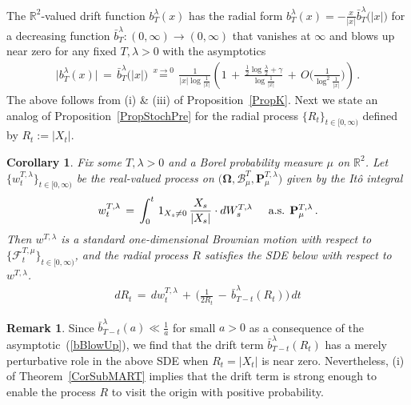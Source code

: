 \documentclass[10pt]{article}
\def\stackrel#1#2{\mathrel{\mathop{#2}\limits^{#1}}}
\numberwithin{equation}{section}
\newtheorem{corollary}[theorem]{Corollary}
\theoremstyle{definition}
\newtheorem{remark}[theorem]{Remark}
\newcommand{\R}{{\mathbb R}}
\begin{document}
   The   $\R^2$-valued drift function $b_{T}^{\lambda}(x)$ has the radial form $b_{T}^{\lambda}(x)=-\frac{x}{|x| }\bar{b}_{T}^{\lambda}\big(|x|\big)$ for a decreasing function  $\bar{b}_{T}^{\lambda}:(0,\infty)\rightarrow (0,\infty)$ that vanishes at $\infty$ and blows up near zero for any fixed $T,\lambda>0$ with the asymptotics 
  \begin{align}\label{bBlowUp}
  \big| b_{T}^{\lambda}(x)\big| \,= \,\bar{b}_{T}^{\lambda}\big(|x|\big)\, \stackrel{x\rightarrow 0 }{=}  \,\frac{ 1 }{|x|\log \frac{1}{|x|} }\left(1 \,+\,\frac{\frac{1}{2}\log\frac{\lambda}{2} +\gamma   }{\log\frac{1}{|x|}   } \,+\,\mathit{O}\bigg(  \frac{1  }{\log^2\frac{1}{|x|}   }   \bigg)    \right)    \,.
  \end{align}
The above follows from (i) \& (iii) of Proposition~\ref{PropK}.  Next we state an analog of Proposition~\ref{PropStochPre} for the radial process $\{ R_t\}_{t\in [0,\infty)}$ defined by $R_t:=|X_t|$.
\begin{corollary}\label{CorollaryToPropStoch}  Fix some $T,\lambda >0$ and a Borel probability measure $\mu$ on $\R^2$.  Let $\{  w^{T,\lambda }_t\}_{t\in [0,\infty)}$ be the real-valued process  on $\big(\boldsymbol{\Omega}, \mathscr{B}^{T}_{\mu},\mathbf{P}^{T,\lambda}_{\mu}\big)$   given by the It\^o integral
 $$w^{T,\lambda }_t\,=\,\int_0^t \,1_{X_s\neq 0}\,\frac{X_s}{|X_s|}\cdot  dW_{s}^{T,\lambda} \hspace{.5cm}\text{a.s.    $\mathbf{P}^{T,\lambda}_{\mu}$}  \,.    $$
Then  $w^{T,\lambda }$ is a standard one-dimensional Brownian motion with respect to $\{\mathscr{F}_t^{T,\mu}   \}_{t\in [0,\infty)}$, and the radial process  $R$  satisfies the    SDE below with respect to $w^{T,\lambda }$.
\begin{align*}
dR_t\,=\,dw_t^{T,\lambda}\,+\, \bigg(\frac{ 1 }{ 2R_t }\,-\, \bar{b}_{T-t}^{\lambda  }(R_t) \bigg)\, dt 
\end{align*}
\end{corollary}
\begin{remark} Since $\bar{b}_{T-t}^{\lambda  }(a) \ll \frac{1}{a} $ for small $a>0$   as a consequence of the asymptotic~(\ref{bBlowUp}), we find that the drift term $\bar{b}_{T-t}^{\lambda  }(R_t) $ has a merely perturbative role in the above SDE when $R_t=|X_t|$ is near zero.  Nevertheless,  (i) of Theorem~\ref{CorSubMART} implies that the drift term  is strong enough to  enable the process $R$ to  visit the origin with positive probability. 
\end{remark}
\end{document}

